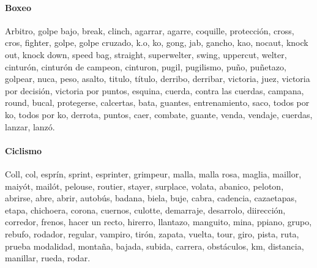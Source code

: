 \documentclass[../all.tex]{subfiles}
\begin{document}
    \paragraph{Boxeo}
    Arbitro, golpe bajo, break, clinch, agarrar, agarre, coquille, protección, cross, cros, fighter, golpe, golpe cruzado, k.o, ko, gong, jab, gancho, kao, nocaut, knock out, knock down, speed bag, straight, superwelter, swing, uppercut, welter, cinturón, cinturón de campeon, cinturon, pugil, pugilismo, puño, puñetazo, golpear, nuca, peso, asalto, titulo, título, derribo, derribar, victoria, juez, victoria por decisión, victoria por puntos, esquina, cuerda, contra las cuerdas, campana, round, bucal, protegerse, calcertas, bata, guantes, entrenamiento, saco, todos por ko, todos por ko, derrota, puntos, caer, combate, guante, venda, vendaje, cuerdas, lanzar, lanzó.
    \paragraph{Ciclismo}
    Coll, col, esprín, sprint, esprinter, grimpeur, malla, malla rosa, maglia, maillor, maiyót, mailót, pelouse, routier, stayer, surplace, volata, abanico, peloton, abrirse, abre, abrir, autobús, badana, biela, buje, cabra, cadencia, cazaetapas, etapa, chichoera, corona, cuernos, culotte, demarraje, desarrolo, diirección, corredor, frenos, hacer un recto, hirerro, llantazo, manguito, mina, ppiano, grupo, rebufo, rodador, regular, vampiro, tirón, zapata, vuelta, tour, giro, pista, ruta, prueba modalidad, montaña, bajada, subida, carrera, obstáculos, km, distancia, manillar, rueda, rodar.
\end{document}
